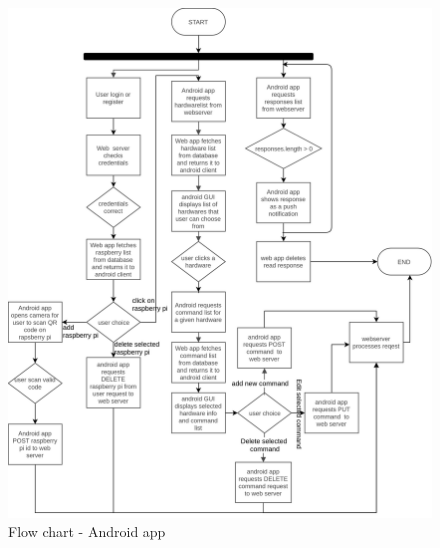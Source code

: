 \documentclass[12pt, oneside, a4paper]{book}
\begin{document}
				\begin{figure}[H]
					\includegraphics[width=\linewidth]{img/flowchart_android.png}
					\caption{Flow chart - Android app}
					\label{fig:ig:flow_android}
				\end{figure}
\end{document}
